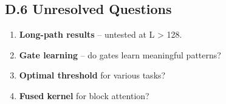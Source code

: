 \subsection{D.6 Unresolved Questions}

\begin{enumerate}
\item \textbf{Long-path results} -- untested at L > 128.
\item \textbf{Gate learning} -- do gates learn meaningful patterns?
\item \textbf{Optimal threshold} for various tasks?
\item \textbf{Fused kernel} for block attention?

\end{enumerate}

